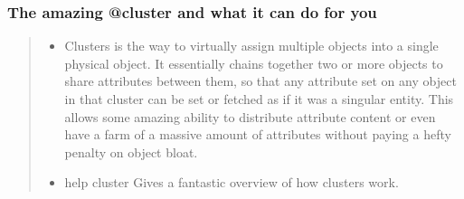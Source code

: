 \documentclass[letterpaper,10pt,english]{sphinxmanual}
\begin{document}
\subsubsection{The amazing @cluster and what it can do for you}
\label{\detokenize{features:the-amazing-cluster-and-what-it-can-do-for-you}}\begin{quote}
\begin{itemize}
\item {} 
\sphinxAtStartPar
Clusters is the way to virtually assign multiple objects into
a single physical object.  It essentially chains together two
or more objects to share attributes between them, so that any
attribute set on any object in that cluster can be set or fetched
as if it was a singular entity.  This allows some amazing ability
to distribute attribute content or even have a farm of a massive
amount of attributes without paying a hefty penalty on object bloat.

\end{itemize}
\begin{itemize}
\item {} 
\sphinxAtStartPar
help cluster  \textendash{} Gives a fantastic overview of how clusters work.

\end{itemize}
\end{quote}
\end{document}
